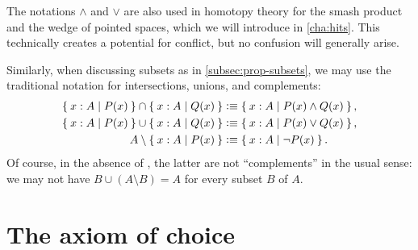 The notations $\land$ and $\lor$ are also used in homotopy theory for the smash product and the wedge of pointed spaces, which we will introduce in \autoref{cha:hits}.
This technically creates a potential for conflict, but no confusion will generally arise.

Similarly, when discussing subsets as in \autoref{subsec:prop-subsets}, we may use the traditional notation for intersections, unions, and complements:
%
%
%
%
%
%
\begin{align*}
  \Set{x:A | P(x)} \cap \Set{x:A | Q(x)}
  &\vcentcolon\equiv \Set{x:A | P(x) \land Q(x)},\\
  \Set{x:A | P(x)} \cup \Set{x:A | Q(x)}
  &\vcentcolon\equiv \Set{x:A | P(x) \lor Q(x)},\\
  A \setminus \Set{x:A | P(x)}
  &\vcentcolon\equiv \Set{x:A | \neg P(x)}.
\end{align*}
Of course, in the absence of \LEM{}, the latter are not ``complements'' in the usual sense: we may not have $B \cup (A\setminus B) = A$ for every subset $B$ of $A$.

%
%
%


\section{The axiom of choice}
\label{sec:axiom-choice}


